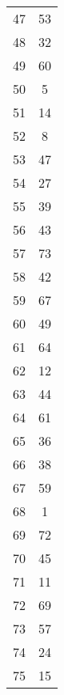 \begin{table}
\begin{tabular}{c c }
47 & 53 \\
48 & 32 \\
49 & 60 \\
50 & 5 \\
51 & 14 \\
52 & 8 \\
53 & 47 \\
54 & 27 \\
55 & 39 \\
56 & 43 \\
57 & 73 \\
58 & 42 \\
59 & 67 \\
60 & 49 \\
61 & 64 \\
62 & 12 \\
63 & 44 \\
64 & 61 \\
65 & 36 \\
66 & 38 \\
67 & 59 \\
68 & 1 \\
69 & 72 \\
70 & 45 \\
71 & 11 \\
72 & 69 \\
73 & 57 \\
74 & 24 \\
75 & 15 \\
\hline
\end{tabular}
\end{table}